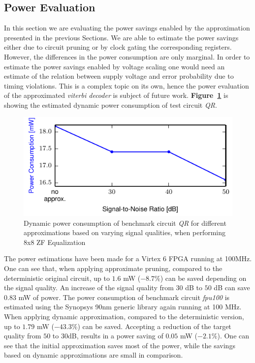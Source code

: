 \documentclass[10pt,twocolumn]{IEEEtran} %
\begin{document}
\subsection{\bf{Power Evaluation}}
\label{subsec:power}
In this section we are evaluating the power savings enabled by the approximation presented in the previous Sections. We are able to estimate the power savings either due to circuit pruning or by clock gating the corresponding registers. However, the differences in the power consumption are only marginal. In order to estimate the power savings enabled by voltage scaling one would need an estimate of the relation between supply voltage and error probability due to timing violations. This is a complex topic on its own, hence the power evaluation of the approximated \emph{viterbi decoder} is subject of future work. {\bf Figure~\ref{fig:power_qr}} is showing the estimated dynamic power consumption of test circuit \emph{QR}. 
\begin{figure}[htb]
  \centering
  \includegraphics[width=.48\textwidth]{figs/power_qr}
  \caption{Dynamic power consumption of benchmark circuit \emph{QR} for different approximations based on varying signal qualities, when performing 8x8 ZF Equalization}
  \label{fig:power_qr}
\end{figure}
The power estimations have been made for a Virtex 6 FPGA running at 100MHz. One can see that, when applying approximate pruning, compared to the deterministic original circuit, up to $1.6$ mW ($-8.7\%$) can be saved depending on the signal quality. An increase of the signal quality from $30$ dB to $50$ dB can save $0.83$ mW of power.
The power consumption of benchmark circuit \emph{fpu100} is estimated using the Synopsys 90nm generic library again running at 100 MHz. When applying dynamic approximation, compared to the deterministic version, up to $1.79$ mW ($-43.3\%$) can be saved. Accepting a reduction of the target quality from $50$ to $30$dB, results in a power saving of $0.05$ mW ($-2.1\%$).
One can see that the initial approximation saves most of the power, while the savings based on dynamic approximations are small in comparison. 
\end{document}
